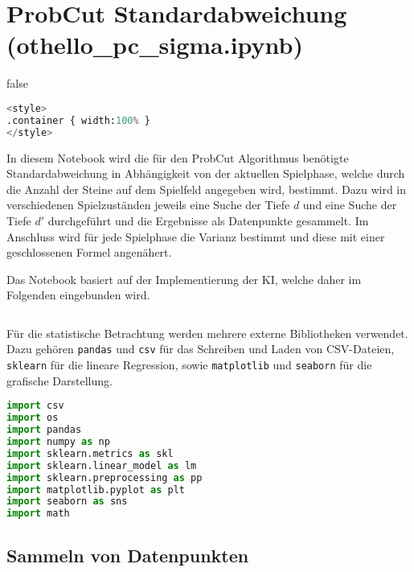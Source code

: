 \hypertarget{probcut-standardabweichung-othello_pc_sigma.ipynb}{%
\section{ProbCut Standardabweichung
(othello\_pc\_sigma.ipynb)}\label{probcut-standardabweichung-othello_pc_sigma.ipynb}}

\label{sec:pcsigma} \ifx false

\begin{lstlisting}[language=Python]
%%HTML
<style>
.container { width:100% }
</style>
\end{lstlisting}

\fi In diesem Notebook wird die für den ProbCut Algorithmus benötigte
Standardabweichung in Abhängigkeit von der aktuellen Spielphase, welche
durch die Anzahl der Steine auf dem Spielfeld angegeben wird, bestimmt.
Dazu wird in verschiedenen Spielzuständen jeweils eine Suche der Tiefe
\(d\) und eine Suche der Tiefe \(d'\) durchgeführt und die Ergebnisse
als Datenpunkte gesammelt. Im Anschluss wird für jede Spielphase die
Varianz bestimmt und diese mit einer geschlossenen Formel angenähert.

Das Notebook basiert auf der Implementierung der \ac{KI}, welche daher
im Folgenden eingebunden wird.

\begin{lstlisting}[language=Python]
%run othello_ai.ipynb
\end{lstlisting}

Für die statistische Betrachtung werden mehrere externe Bibliotheken
verwendet. Dazu gehören \passthrough{\lstinline!pandas!} und
\passthrough{\lstinline!csv!} für das Schreiben und Laden von
CSV-Dateien, \passthrough{\lstinline!sklearn!} für die lineare
Regression, sowie \passthrough{\lstinline!matplotlib!} und
\passthrough{\lstinline!seaborn!} für die grafische Darstellung.

\begin{lstlisting}[language=Python]
import csv
import os
import pandas
import numpy as np
import sklearn.metrics as skl
import sklearn.linear_model as lm
import sklearn.preprocessing as pp
import matplotlib.pyplot as plt
import seaborn as sns
import math
\end{lstlisting}

\hypertarget{sammeln-von-datenpunkten}{%
\subsection{Sammeln von Datenpunkten}\label{sammeln-von-datenpunkten}}


